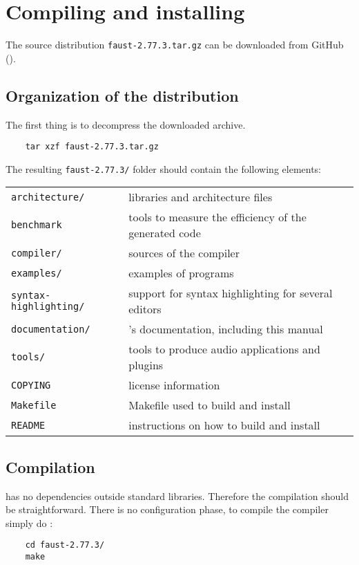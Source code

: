 \chapter{Compiling and installing \faust}
\label{install}

The \faust source distribution \lstinline'faust-2.77.3.tar.gz' can be downloaded from GitHub ().

\section{Organization of the distribution}
The first thing is to decompress the downloaded archive. 
\begin{lstlisting}
	tar xzf faust-2.77.3.tar.gz
\end{lstlisting}

The resulting \lstinline'faust-2.77.3/' folder should contain the following elements:

\begin{tabular}{ll}
	\lstinline'architecture/' 		&\faust libraries and architecture files\\
	\lstinline'benchmark'			&tools to measure the efficiency of the generated code\\
	\lstinline'compiler/'			&sources of the \faust compiler\\
	\lstinline'examples/'			&examples of \faust programs\\
	\lstinline'syntax-highlighting/'&	support for syntax highlighting for several editors\\
	\lstinline'documentation/' 		&\faust's documentation, including this manual\\
	\lstinline'tools/'				&tools to produce audio applications and plugins\\
	\lstinline'COPYING'			&license information\\
	\lstinline'Makefile'			&Makefile used to build and install \faust\\
	\lstinline'README'			&instructions on how to build and install \faust
\end{tabular}

\section{Compilation}
\faust has no dependencies outside standard libraries. Therefore the compilation should be straightforward. There is no configuration phase, to compile the \faust compiler simply do :
\begin{lstlisting}
	cd faust-2.77.3/
	make
\end{lstlisting}

